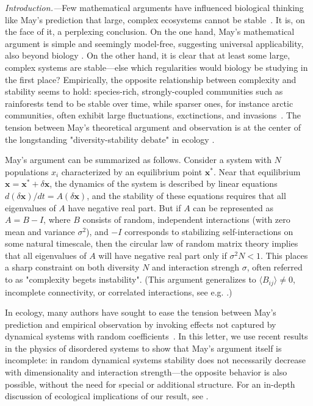 \emph{Introduction.---}Few mathematical arguments have influenced biological thinking like May's prediction that large, complex ecosystems cannot be stable~\cite{May1972}.
It is, on the face of it, a perplexing conclusion.
On the one hand, May's mathematical argument is simple and seemingly model-free, suggesting universal applicability, also beyond biology \cite{Haldane2011, Moran2019}.
On the other hand, it is clear that at least some large, complex systems are stable---else which regularities would biology be studying in the first place? 
Empirically, the opposite relationship between complexity and stability seems to hold: species-rich, strongly-coupled communities such as rainforests tend to be stable over time, while sparser ones, for instance arctic communities, often exhibit large fluctuations, exctinctions, and invasions~\cite{Hutchinson1959,Odum1959,MacArthur1955}. 
The tension between May's theoretical argument and  observation is at the center of the longstanding "diversity-stability debate" in ecology \cite{McCann2000, Loreau2022}.

May's argument can be summarized as follows.
Consider a system with $N$ populations $x_i$ characterized by an equilibrium point $\mathbf x^*$.
Near that equilibrium $\mathbf x = \mathbf x^* + \delta \mathbf x$, the dynamics of the system is described by linear equations $d(\delta \mathbf x)/dt = A (\delta \mathbf x)$, and the stability of these equations requires that all eigenvalues of $A$ have negative real part.
But if $A$ can be represented as $A = B - I$, where $B$ consists of random, independent interactions (with zero 
mean and variance $\sigma^2$), and $-I$ corresponds to stabilizing self-interactions on some natural timescale, 
then the circular law of random matrix theory implies that all eigenvalues of $A$ will have negative real part only if $\sigma^2 N < 1$.
This places a sharp constraint on both diversity $N$ and interaction strengh $\sigma$, often referred to as "complexity begets instability".
(This argument generalizes to $\langle B_{ij}\rangle \neq 0$, incomplete connectivity, or correlated interactions, see e.g. \cite{allesina2015stability}.)

In ecology, many authors have sought to ease the tension between May's prediction and empirical observation by invoking effects not captured by dynamical systems with random coefficients~\cite{McCann2000,Chesson2000,Mougi2012,Rohr2014,Barabas2017,Grilli2017}. 
In this letter, we use recent results in the physics of disordered systems \cite{Ahmadian2015, Roy2019} to show that May's argument itself is incomplete: in random dynamical systems stability does not necessarily decrease with dimensionality and interaction strength---the opposite behavior is also possible, without the need for special or additional structure.
For an in-depth discussion of ecological implications of our result, see \cite{Hatton2023}.